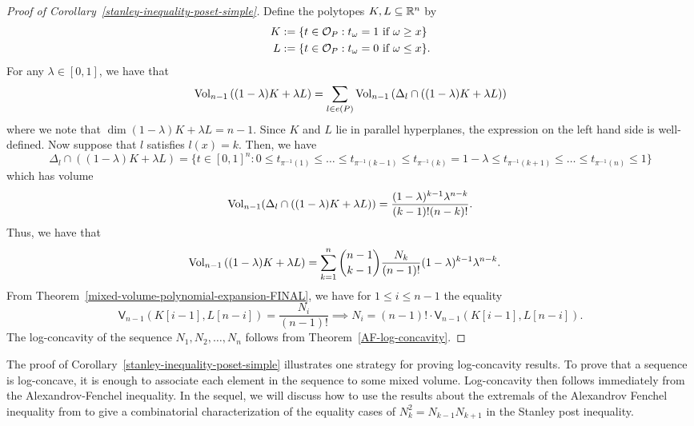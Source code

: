 \documentclass{puthesis-UG}
\begin{document}
\begin{proof}[Proof of Corollary~\ref{stanley-inequality-poset-simple}]
	Define the polytopes $K, L \subseteq \mathbb{R}^{n}$ by 
	\begin{align*}
		K & := \{t \in \mathcal{O}_P : t_\omega = 1 \text{ if } \omega \geq x\} \\
		L & := \{t \in \mathcal{O}_P : t_\omega = 0 \text{ if } \omega \leq x\}.
	\end{align*}
	For any $\lambda \in [0, 1]$, we have that 
	\[
		\operatorname{Vol}_{n-1} \left ( (1 - \lambda) K + \lambda L \right ) = \sum_{l \in e(P)}  \operatorname{Vol}_{n-1} \left ( \Delta_l \cap \left((1-\lambda) K + \lambda L\right) \right )
	\]
	where we note that $\dim (1 - \lambda)K + \lambda L = n-1$. Since $K$ and $L$ lie in parallel hyperplanes, the expression on the left hand side is well-defined. Now suppose that $l$ satisfies $l(x) = k$. Then, we have 
	\[
		\Delta_l \cap ((1 - \lambda) K + \lambda L) = \{t \in [0, 1]^n : 0 \leq t_{\pi^{-1}(1)} \leq \ldots \leq t_{\pi^{-1}(k-1)} \leq t_{\pi^{-1}(k)} = 1-\lambda \leq t_{\pi^{-1}(k+1)} \leq \ldots \leq t_{\pi^{-1}(n)} \leq 1\}
	\]
	which has volume 
	\[
		\operatorname{Vol}_{n-1} (\Delta_l \cap \left((1 - \lambda) K + \lambda L\right)) = \frac{(1-\lambda)^{k-1} \lambda^{n-k}}{(k-1)! (n-k)!}.
	\]
	Thus, we have that 
	\begin{align*}
		\operatorname{Vol}_{n-1}\left((1-\lambda) K + \lambda L\right) & = \sum_{k = 1}^n \binom{n-1}{k-1} \frac{N_k}{(n-1)!} (1-\lambda)^{k-1} \lambda^{n-k}.
	\end{align*}
	From Theorem~\ref{mixed-volume-polynomial-expansion-FINAL}, we have for $1 \leq i \leq n-1$ the equality
	\[
		\mathsf{V}_{n-1} (K[i-1], L[n-i]) = \frac{N_i}{(n-1)!} \implies N_i = (n-1)! \cdot \mathsf{V}_{n-1} (K[i-1], L[n-i]).
	\]
	The log-concavity of the sequence $N_1, N_2, \ldots, N_n$ follows from Theorem~\ref{AF-log-concavity}. 
\end{proof}

The proof of Corollary~\ref{stanley-inequality-poset-simple} illustrates one strategy for proving log-concavity results. To prove that a sequence is log-concave, it is enough to associate each element in the sequence to some mixed volume. Log-concavity then follows immediately from the Alexandrov-Fenchel inequality. In the sequel, we will discuss how to use the results about the extremals of the Alexandrov Fenchel inequality from \cite{shenfeld2022extremals} to give a combinatorial characterization of the equality cases of $N_k^2 = N_{k-1} N_{k+1}$ in the Stanley post inequality. 
\end{document}
